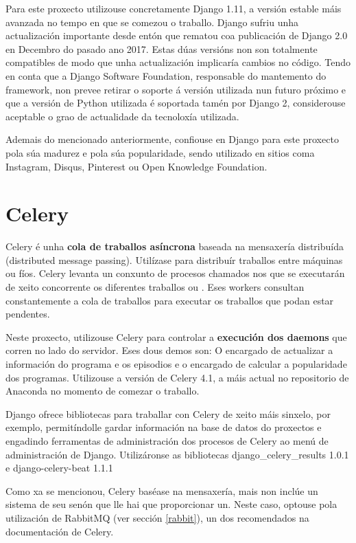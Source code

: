 Para este proxecto utilizouse concretamente Django 1.11, a versión estable máis avanzada no tempo en que se comezou o 
traballo. Django sufriu unha actualización importante desde entón que rematou coa publicación de Django 2.0 en Decembro do pasado ano 2017. Estas dúas versións non son totalmente compatibles de modo que unha actualización implicaría cambios no 
código. Tendo en conta que a Django Software Foundation, responsable do mantemento do framework, non prevee retirar o soporte á versión utilizada nun futuro próximo e que a versión de Python utilizada é soportada tamén por Django 2\cite{django2}, considerouse aceptable o grao de actualidade da tecnoloxía utilizada.    

Ademais do mencionado anteriormente, confiouse en Django para este proxecto pola súa madurez e pola súa popularidade, sendo  utilizado en sitios coma Instagram, Disqus, Pinterest ou Open Knowledge Foundation.


\section{Celery}

Celery é unha \textbf{cola de traballos asíncrona} baseada na mensaxería distribuída (distributed message passing). Utilízase para distribuír traballos entre máquinas ou fíos. Celery levanta un conxunto de procesos chamados  nos que se executarán de xeito concorrente os diferentes traballos ou . Eses workers consultan constantemente a cola de traballos para executar os traballos que podan estar pendentes\cite{celery}.

Neste proxecto, utilizouse Celery para controlar a \textbf{execución dos daemons} que corren no lado do servidor. Eses dous demos son: O encargado de actualizar a información do programa e os episodios e o encargado de calcular a popularidade dos programas. Utilizouse a versión de Celery 4.1, a máis actual no repositorio de Anaconda no momento de comezar o traballo.

Django ofrece bibliotecas para traballar con Celery de xeito máis sinxelo, por exemplo, permitíndolle gardar información na base de datos do proxectos e engadindo ferramentas de administración dos procesos de Celery ao menú de administración de Django. Utilizáronse as bibliotecas django\_celery\_results 1.0.1 e django-celery-beat 1.1.1

Como xa se mencionou, Celery baséase na mensaxería, mais non inclúe un sistema de seu senón que lle hai que proporcionar un. Neste caso, optouse pola utilización de RabbitMQ (ver sección \ref{rabbit}), un dos recomendados na documentación de Celery.


